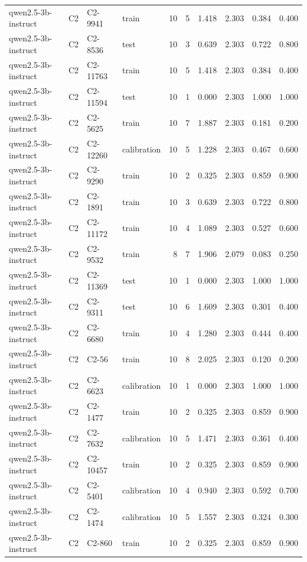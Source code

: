 \begin{table}
\begin{tabular}{llllrrrrrr}
qwen2.5-3b-instruct & C2 & C2-9941 & train & 10 & 5 & 1.418 & 2.303 & 0.384 & 0.400 \\
qwen2.5-3b-instruct & C2 & C2-8536 & test & 10 & 3 & 0.639 & 2.303 & 0.722 & 0.800 \\
qwen2.5-3b-instruct & C2 & C2-11763 & train & 10 & 5 & 1.418 & 2.303 & 0.384 & 0.400 \\
qwen2.5-3b-instruct & C2 & C2-11594 & test & 10 & 1 & 0.000 & 2.303 & 1.000 & 1.000 \\
qwen2.5-3b-instruct & C2 & C2-5625 & train & 10 & 7 & 1.887 & 2.303 & 0.181 & 0.200 \\
qwen2.5-3b-instruct & C2 & C2-12260 & calibration & 10 & 5 & 1.228 & 2.303 & 0.467 & 0.600 \\
qwen2.5-3b-instruct & C2 & C2-9290 & train & 10 & 2 & 0.325 & 2.303 & 0.859 & 0.900 \\
qwen2.5-3b-instruct & C2 & C2-1891 & train & 10 & 3 & 0.639 & 2.303 & 0.722 & 0.800 \\
qwen2.5-3b-instruct & C2 & C2-11172 & train & 10 & 4 & 1.089 & 2.303 & 0.527 & 0.600 \\
qwen2.5-3b-instruct & C2 & C2-9532 & train & 8 & 7 & 1.906 & 2.079 & 0.083 & 0.250 \\
qwen2.5-3b-instruct & C2 & C2-11369 & test & 10 & 1 & 0.000 & 2.303 & 1.000 & 1.000 \\
qwen2.5-3b-instruct & C2 & C2-9311 & test & 10 & 6 & 1.609 & 2.303 & 0.301 & 0.400 \\
qwen2.5-3b-instruct & C2 & C2-6680 & train & 10 & 4 & 1.280 & 2.303 & 0.444 & 0.400 \\
qwen2.5-3b-instruct & C2 & C2-56 & train & 10 & 8 & 2.025 & 2.303 & 0.120 & 0.200 \\
qwen2.5-3b-instruct & C2 & C2-6623 & calibration & 10 & 1 & 0.000 & 2.303 & 1.000 & 1.000 \\
qwen2.5-3b-instruct & C2 & C2-1477 & train & 10 & 2 & 0.325 & 2.303 & 0.859 & 0.900 \\
qwen2.5-3b-instruct & C2 & C2-7632 & calibration & 10 & 5 & 1.471 & 2.303 & 0.361 & 0.400 \\
qwen2.5-3b-instruct & C2 & C2-10457 & train & 10 & 2 & 0.325 & 2.303 & 0.859 & 0.900 \\
qwen2.5-3b-instruct & C2 & C2-5401 & calibration & 10 & 4 & 0.940 & 2.303 & 0.592 & 0.700 \\
qwen2.5-3b-instruct & C2 & C2-1474 & calibration & 10 & 5 & 1.557 & 2.303 & 0.324 & 0.300 \\
qwen2.5-3b-instruct & C2 & C2-860 & train & 10 & 2 & 0.325 & 2.303 & 0.859 & 0.900 \\

\end{tabular}
\end{table}
